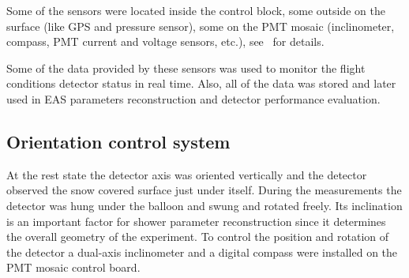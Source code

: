 \documentclass[universe,article,submit,moreauthors,pdftex]{Definitions/mdpi}
\begin{document}

Some of the sensors were located inside the control block, some outside on the surface (like GPS and pressure sensor), some on the PMT mosaic (inclinometer, compass, PMT current and voltage sensors, etc.), see~\cite{Ant20} for details.

Some of the data provided by these sensors was used to monitor the flight conditions detector status in real time. Also, all of the data was stored and later used in EAS parameters reconstruction and detector performance evaluation.


\subsection{Orientation control system}
\label{sect:orientation}

At the rest state the detector axis was oriented vertically and the detector observed the snow covered surface just under itself. During the measurements the detector was hung under the balloon and swung and rotated freely. Its inclination is an important factor for shower parameter reconstruction since it determines the overall geometry of the experiment. To control the position and rotation of the detector a dual-axis inclinometer and a digital compass were installed on the PMT mosaic control board. 
\end{document}
